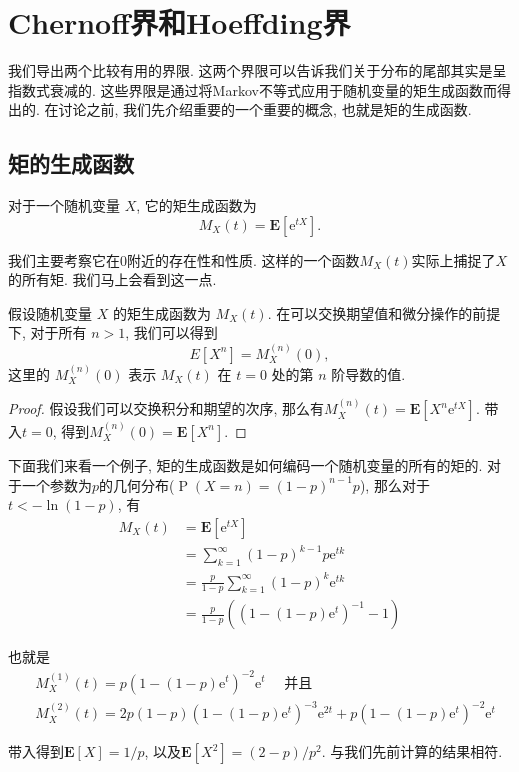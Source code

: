 \section{Chernoff界和Hoeffding界}

我们导出两个比较有用的界限. 这两个界限可以告诉我们关于分布的尾部其实是呈指数式衰减的. 这些界限是通过将Markov不等式应用于随机变量的矩生成函数而得出的. 在讨论之前, 我们先介绍重要的一个重要的概念, 也就是矩的生成函数. 

\subsection{矩的生成函数}

\begin{definition}
    对于一个随机变量 $X$, 它的矩生成函数为$$M_X(t)=\mathbf{E}\left[\mathrm{e}^{t X}\right].$$
\end{definition}

我们主要考察它在0附近的存在性和性质. 这样的一个函数$M_X(t)$实际上捕捉了$X$的所有矩. 我们马上会看到这一点.

\begin{theorem}
    假设随机变量 $X$ 的矩生成函数为 $M_X(t)$. 
在可以交换期望值和微分操作的前提下, 对于所有 $n > 1$, 我们可以得到
$$E[X^n] = M_X^{(n)}(0),$$这里的 $M_X^{(n)}(0)$ 表示 $M_X(t)$ 在 $t = 0$ 处的第 $n$ 阶导数的值. 

\end{theorem}
\begin{proof}
    假设我们可以交换积分和期望的次序, 那么有$M_X^{(n)}(t)=\mathbf{E}\left[X^n \mathrm{e}^{t X}\right]$. 带入$t=0$, 得到$M_X^{(n)}(0)=\mathbf{E}\left[X^n\right]$. 
\end{proof}

\begin{example}
    下面我们来看一个例子, 矩的生成函数是如何编码一个随机变量的所有的矩的. 对于一个参数为$p$的几何分布($\operatorname{P}(X=n)=(1-p)^{n-1} p$), 那么对于$t<-\ln(1-p)$, 有
    $$\begin{aligned} M_X(t) & =\mathbf{E}\left[\mathrm{e}^{t X}\right] \\ & =\sum_{k=1}^{\infty}(1-p)^{k-1} p \mathrm{e}^{t k} \\ & =\frac{p}{1-p} \sum_{k=1}^{\infty}(1-p)^k \mathrm{e}^{t k} \\ & =\frac{p}{1-p}\left(\left(1-(1-p) \mathrm{e}^t\right)^{-1}-1\right)\end{aligned}$$

    也就是
    $$\begin{aligned} & M_X^{(1)}(t)=p\left(1-(1-p) \mathrm{e}^t\right)^{-2} \mathrm{e}^t \quad \text { 并且 } \\ & M_X^{(2)}(t)=2 p(1-p)\left(1-(1-p) \mathrm{e}^t\right)^{-3} \mathrm{e}^{2 t}+p\left(1-(1-p) \mathrm{e}^t\right)^{-2} \mathrm{e}^t\end{aligned}$$

    带入得到$\mathbf{E}[X]=1 / p$, 以及$\mathbf{E}\left[X^2\right]=(2-p) / p^2$. 与我们先前计算的结果相符.
\end{example}


